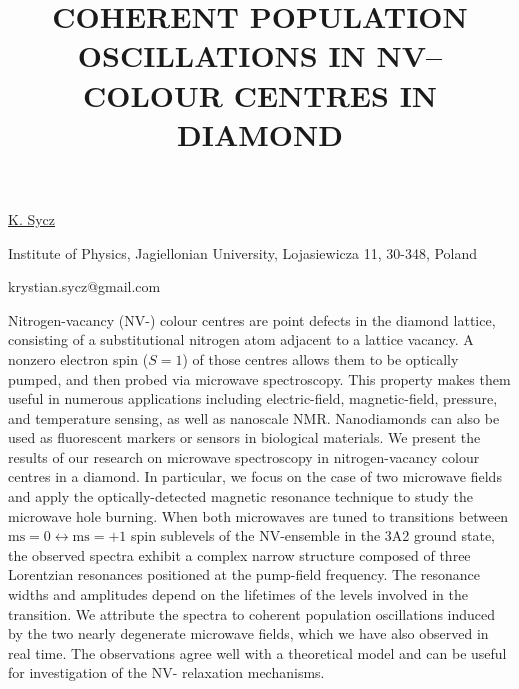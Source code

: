 \title{COHERENT POPULATION OSCILLATIONS IN NV– COLOUR CENTRES IN DIAMOND}

\underline{K. Sycz} 

{\normalsize{\vspace{-4mm}
Institute of Physics,
Jagiellonian University,
Lojasiewicza 11,
30-348, Poland

\email krystian.sycz@gmail.com}}

Nitrogen-vacancy (NV-) colour centres are point defects in the diamond lattice, consisting of a substitutional nitrogen atom adjacent to a lattice vacancy. A nonzero electron spin ($S=1$) of those centres allows them to be optically pumped, and then probed via microwave spectroscopy. This property makes them useful in numerous applications including electric-field, magnetic-field, pressure, and temperature sensing, as well as nanoscale NMR. Nanodiamonds can also be used as fluorescent markers or sensors in biological materials.
We present the results of our research on microwave spectroscopy in nitrogen-vacancy colour centres in a diamond. In particular, we focus on the case of two microwave fields and apply the optically-detected magnetic resonance technique to study the microwave hole burning. When both microwaves are tuned to transitions between $\text{ms}=0\leftrightarrow\text{ms}=+1$ spin sublevels of the NV-ensemble in the 3A2 ground state, the observed spectra exhibit a complex narrow structure composed of three Lorentzian resonances positioned at the pump-field frequency. The resonance widths and amplitudes depend on the lifetimes of the levels involved in the transition. We attribute the spectra to coherent population oscillations induced by the two nearly degenerate microwave fields, which we have also observed in real time. The observations agree well with a theoretical model and can be useful for investigation of the NV- relaxation mechanisms.

\vspace{\baselineskip} 